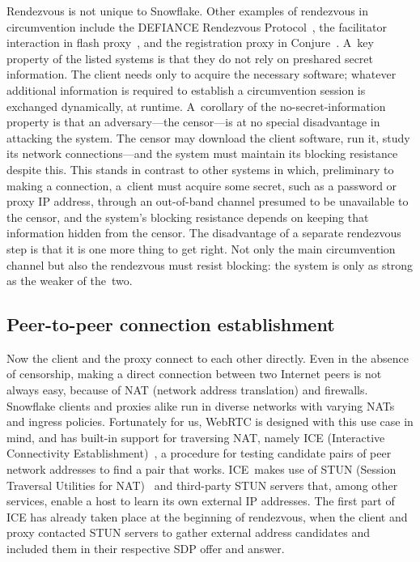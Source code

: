 \documentclass[letterpaper,twocolumn]{article}
\begin{document}
Rendezvous is not unique to Snowflake.
Other examples of rendezvous in circumvention include
the DEFIANCE Rendezvous Protocol~\cite[\S 3]{Lincoln2012a},
the facilitator interaction in flash proxy~\cite[\S 3]{Fifield2012a},
and the registration proxy in Conjure~\cite[\S 4.1]{Frolov2019b}.
A~key property of the listed systems
is that they do not rely on preshared secret information.
The client needs only to acquire the necessary software;
whatever additional information is required to establish a circumvention session
is exchanged dynamically, at runtime.
A~corollary of the no-secret-information property
is that an adversary---the censor---is
at no special disadvantage in attacking the system.
The censor may download the client software,
run it, study its network connections---and
the system must maintain its blocking resistance despite this.
This stands in contrast to other systems in which,
preliminary to making a connection,
a~client must acquire some secret,
such as a password or proxy IP address,
through an out-of-band channel
presumed to be unavailable to the censor,
and the system's blocking resistance depends on
keeping that information hidden from the censor.
The disadvantage of a separate rendezvous step
is that it is one more thing to get right.
Not only the main circumvention channel
but also the rendezvous must resist blocking:
the system is only as strong as the weaker of the~two.

\subsection{Peer-to-peer connection establishment}
\label{sec:connection}

Now the client and the proxy connect to each other directly.
Even in the absence of censorship,
making a direct connection between two Internet peers is not always easy,
because of NAT (network address translation) and firewalls.
Snowflake clients and proxies alike run in diverse networks
with varying NATs and ingress policies.
Fortunately for us,
WebRTC is designed with this use case in mind,
and has built-in support for traversing NAT, namely
ICE (Interactive Connectivity Establishment)~\cite{rfc8445},
a procedure for testing candidate pairs of peer network addresses
to find a pair that works.
ICE~makes use of
STUN (Session Traversal Utilities for NAT)~\cite{rfc8489}
and third-party STUN servers that, among other services,
enable a host to learn its own external IP addresses.
The first part of ICE has already taken place at the beginning of rendezvous,
when the client and proxy contacted STUN servers to gather
external address candidates and included them in their respective
SDP offer and answer.
\end{document}
